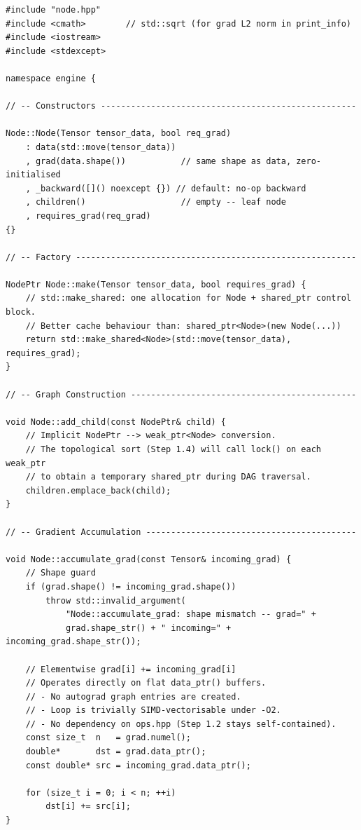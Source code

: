 \documentclass[12pt, a4paper]{article}
\begin{document}
\begin{lstlisting}[caption={\texttt{engine/node.cpp} - key implementation sections}]
#include "node.hpp"
#include <cmath>        // std::sqrt (for grad L2 norm in print_info)
#include <iostream>
#include <stdexcept>

namespace engine {

// -- Constructors ---------------------------------------------------

Node::Node(Tensor tensor_data, bool req_grad)
    : data(std::move(tensor_data))
    , grad(data.shape())           // same shape as data, zero-initialised
    , _backward([]() noexcept {}) // default: no-op backward
    , children()                   // empty -- leaf node
    , requires_grad(req_grad)
{}

// -- Factory --------------------------------------------------------

NodePtr Node::make(Tensor tensor_data, bool requires_grad) {
    // std::make_shared: one allocation for Node + shared_ptr control block.
    // Better cache behaviour than: shared_ptr<Node>(new Node(...))
    return std::make_shared<Node>(std::move(tensor_data), requires_grad);
}

// -- Graph Construction ---------------------------------------------

void Node::add_child(const NodePtr& child) {
    // Implicit NodePtr --> weak_ptr<Node> conversion.
    // The topological sort (Step 1.4) will call lock() on each weak_ptr
    // to obtain a temporary shared_ptr during DAG traversal.
    children.emplace_back(child);
}

// -- Gradient Accumulation ------------------------------------------

void Node::accumulate_grad(const Tensor& incoming_grad) {
    // Shape guard
    if (grad.shape() != incoming_grad.shape())
        throw std::invalid_argument(
            "Node::accumulate_grad: shape mismatch -- grad=" +
            grad.shape_str() + " incoming=" + incoming_grad.shape_str());

    // Elementwise grad[i] += incoming_grad[i]
    // Operates directly on flat data_ptr() buffers.
    // - No autograd graph entries are created.
    // - Loop is trivially SIMD-vectorisable under -O2.
    // - No dependency on ops.hpp (Step 1.2 stays self-contained).
    const size_t  n   = grad.numel();
    double*       dst = grad.data_ptr();
    const double* src = incoming_grad.data_ptr();

    for (size_t i = 0; i < n; ++i)
        dst[i] += src[i];
}


\end{lstlisting}
\end{document}
